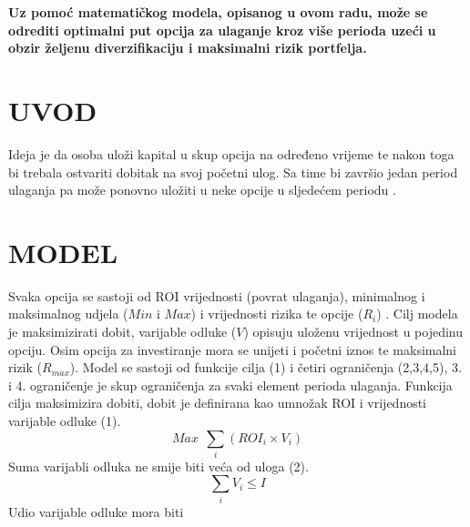 \documentclass[9pt]{extarticle}
\newcommand{\prored}{\vspace{12pt}} \newcommand{\indentacija}{\hspace{3,5mm}}
\begin{document}
 
 \maketitle
    
\begin{multicols*}{2}
\textbf{Uz pomoć matematičkog modela, opisanog u ovom radu, može se odrediti optimalni put opcija za ulaganje 
kroz više perioda uzeći u obzir željenu diverzifikaciju i maksimalni rizik portfelja.\\ } \section{\centering 
UVOD} \indentacija Ideja je da osoba uloži kapital u skup opcija na određeno vrijeme te nakon toga bi trebala 
ostvariti dobitak na svoj početni ulog. Sa time bi završio jedan period ulaganja pa može ponovno uložiti u neke 
opcije u sljedećem periodu \cite{LinearProgrammingandApplication:}. \section{\centering MODEL} \indentacija 
Svaka opcija se sastoji od ROI vrijednosti (povrat ulaganja), minimalnog i maksimalnog udjela (\(Min\) i 
\(Max\)) \cite{MathWorks} i vrijednosti rizika te opcije (\( R_i \)) \cite{HowInvestmentRiskIsQuantified}. Cilj 
modela je maksimizirati dobit, varijable odluke (\(V\)) opisuju uloženu vrijednost u pojedinu opciju. Osim 
opcija za investiranje mora se unijeti i početni iznos te maksimalni rizik (\( R_{max} \)). \prored \noindent 
Model se sastoji od funkcije cilja (1) i četiri ograničenja (2,3,4,5), 3. i 4. ograničenje je skup ograničenja 
za svaki element perioda ulaganja. \prored \noindent
 Funkcija cilja maksimizira dobiti, dobit je definirana kao umnožak ROI i vrijednosti varijable odluke (1). 
\begin{equation}
 Max \ \ \sum_i (ROI_i \times V_i) \end{equation} \prored \noindent Suma varijabli odluka ne smije biti veća od 
uloga (2). \begin{equation} \sum_i V_i \leq I \end{equation} \prored \noindent Udio varijable odluke mora biti 

\end{multicols*}
\end{document}
